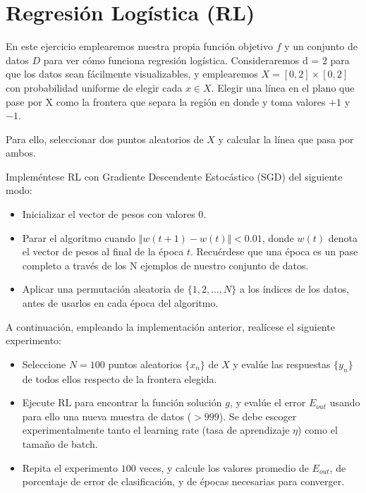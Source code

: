 \section{Regresión Logística (RL)}

En este ejercicio emplearemos nuestra propia función objetivo $f$ y un conjunto
de datos $D$ para ver cómo funciona regresión logística. Consideraremos d = 2
para que los datos sean fácilmente visualizables, y emplearemos 
$X = [0, 2] \times [0, 2]$ con probabilidad uniforme de elegir cada $x \in X$.
Elegir una línea en el plano que pase por X como la frontera que separa la
región en donde y toma valores $+1$ y $-1$.

Para ello, seleccionar dos puntos aleatorios de $X$ y calcular la línea que pasa
por ambos.

Impleméntese RL con Gradiente Descendente Estocástico (SGD) del siguiente modo:

\begin{itemize}
\item Inicializar el vector de pesos con valores 0.
\item Parar el algoritmo cuando $\Vert w(t+1) - w(t) \Vert < 0.01$, donde $w(t)$
denota el vector de pesos al final de la época $t$. Recuérdese que una época es
un pase completo a través de los N ejemplos de nuestro conjunto de datos. 
\item Aplicar una permutación aleatoria de $\{1, 2,..., N\}$ a los índices de
los datos, antes de usarlos en cada época del algoritmo. 
\end{itemize}

A continuación, empleando la implementación anterior, realícese el siguiente
experimento: 

\begin{itemize}
\item Seleccione $N = 100$ puntos aleatorios $\{x_n \}$  de $X$ y evalúe las
respuestas $\{y_n \}$ de todos ellos respecto de la frontera elegida.
\item Ejecute RL para encontrar la función solución $g$, y evalúe el error 
$E_{out}$ usando para ello una nueva muestra de datos ($> 999$). Se debe
escoger experimentalmente tanto el learning rate (tasa de aprendizaje $\eta$)
como el tamaño de batch. 
\item Repita el experimento $100$ veces, y calcule los valores promedio de 
$E_{out}$, de porcentaje de error de clasificación, y de épocas necesarias para
converger.
\end{itemize}


